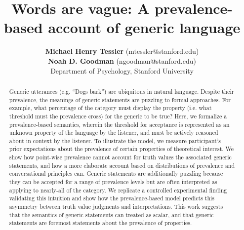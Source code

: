 \documentclass[10pt,letterpaper]{article}
\title{Words are vague: A prevalence-based account of generic language}
\author{{\large \bf Michael Henry Tessler} (mtessler@stanford.edu)\\ {\large \bf Noah D. Goodman} (ngoodman@stanford.edu) \\
  Department of Psychology, Stanford University}
\begin{document}
\maketitle


\begin{abstract}
Generic utterances (e.g. ``Dogs bark'') are ubiquitous in natural language. Despite their prevalence, the meanings of generic statements are puzzling to formal approaches. For example, what percentage of the category must display the property (i.e. what threshold must the prevalence cross) for the generic to be true? Here, we formalize a prevalence-based semantics, wherein the threshold for acceptance is represented as an unknown property of the language by the listener, and must be actively reasoned about in context by the listener. To illustrate the model, we measure participant's prior expectations about the prevalence of certain properties of theoretical interest. We show how point-wise prevalence cannot account for truth values the associated generic statements, and how a more elaborate account based on distributions of prevalence and conversational principles can. Generic statements are additionally puzzling because they can be accepted for a range of prevalence levels but are often interpreted as applying to nearly-all of the category. We replicate a controlled experimental finding validating this intuition and show how the prevalence-based model predicts this asymmetry between truth value judgments and interpretations. This work suggests that the semantics of generic statements can treated as scalar, and that generic statements are foremost statements about the prevalence of properties.


\end{abstract}
\end{document}
